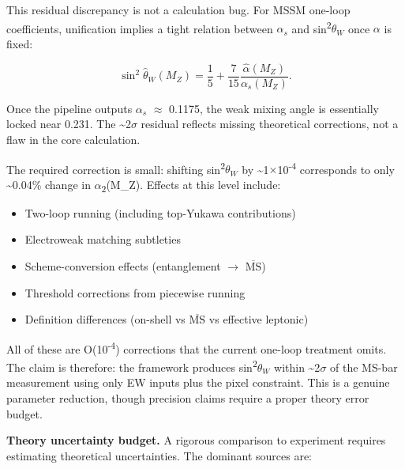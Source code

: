 \documentclass[11pt,a4paper]{article}
\theoremstyle{remark}
\providecommand{\tightlist}{%
  \setlength{\itemsep}{0pt}\setlength{\parskip}{0pt}}
\begin{document}
This residual discrepancy is not a calculation bug. For MSSM one-loop coefficients,
unification implies a tight relation between $\alpha_s$ and sin\textsuperscript{2}$\theta_W$ once \ensuremath{\alpha} is fixed:

\[
\sin^2\hat{\theta}_W(M_Z) = \frac{1}{5} + \frac{7}{15}\frac{\hat{\alpha}(M_Z)}{\alpha_s(M_Z)}.
\]

Once the pipeline outputs $\alpha_s$ \ensuremath{\approx} 0.1175, the weak mixing angle is essentially
locked near 0.231. The \textasciitilde2\ensuremath{\sigma} residual reflects missing theoretical corrections,
not a flaw in the core calculation.

The required correction is small: shifting sin\textsuperscript{2}$\theta_W$ by \textasciitilde1\ensuremath{\times}10\textsuperscript{-4} corresponds to
only \textasciitilde0.04\% change in \ensuremath{\alpha}\textsubscript{2}(M\_Z). Effects at this level include:

\begin{itemize}
\tightlist
\item
  Two-loop running (including top-Yukawa contributions)
\item
  Electroweak matching subtleties
\item
  Scheme-conversion effects (entanglement \ensuremath{\to} \(\overline{\text{MS}}\))
\item
  Threshold corrections from piecewise running
\item
  Definition differences (on-shell vs \(\overline{\text{MS}}\) vs effective leptonic)
\end{itemize}

All of these are O(10\textsuperscript{-4}) corrections that the current one-loop treatment
omits. The claim is therefore: the framework produces sin\textsuperscript{2}$\theta_W$ within \textasciitilde2\ensuremath{\sigma}
of the MS-bar measurement using only EW inputs plus the pixel constraint.
This is a genuine parameter reduction, though precision claims require a
proper theory error budget.

\textbf{Theory uncertainty budget.} A rigorous comparison to experiment requires
estimating theoretical uncertainties. The dominant sources are:
\end{document}
